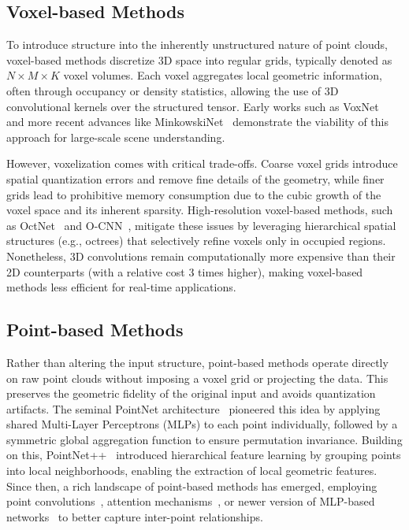 \subsection{Voxel-based Methods}
To introduce structure into the inherently unstructured nature of point clouds,
voxel-based methods discretize 3D space into regular grids, typically denoted
as $N \times M \times K$ voxel volumes. Each voxel aggregates local geometric
information, often through occupancy or density statistics, allowing the use of
3D convolutional kernels over the structured tensor. Early works such as
VoxNet~\cite{maturana2015voxnet} and more recent advances like
MinkowskiNet~\cite{choy20194d} demonstrate the viability of this approach for
large-scale scene understanding.
%

However, voxelization comes with critical trade-offs. Coarse voxel grids
introduce spatial quantization errors and remove fine details of the geometry,
while finer grids lead to prohibitive memory consumption due to the cubic
growth of the voxel space and its inherent sparsity. High-resolution
voxel-based methods, such as OctNet~\cite{riegler2017octnet} and
O-CNN~\cite{wang2017cnn}, mitigate these issues by leveraging hierarchical
spatial structures (e.g., octrees) that selectively refine voxels only in
occupied regions. Nonetheless, 3D convolutions remain computationally more
expensive than their 2D counterparts (with a relative cost 3 times higher), 
making voxel-based methods less efficient for real-time applications.

\subsection{Point-based Methods}
Rather than altering the input structure, point-based methods operate directly
on raw point clouds without imposing a voxel grid or projecting the data. This
preserves the geometric fidelity of the original input and avoids quantization
artifacts. The seminal PointNet architecture~\cite{qi2017pointnet} pioneered
this idea by applying shared Multi-Layer Perceptrons (MLPs) to each point
individually, followed by a symmetric global aggregation function to ensure
permutation invariance.
%
Building on this, PointNet++~\cite{qi2017pointnet++} introduced hierarchical
feature learning by grouping points into local neighborhoods, enabling the
extraction of local geometric features.
%
Since then, a rich landscape of point-based methods has emerged, employing
point convolutions~\cite{thomas2019kpconv}, attention
mechanisms~\cite{zhao2021point}, or newer version of MLP-based
networks~\cite{qian2022pointnext} to better capture inter-point relationships.

